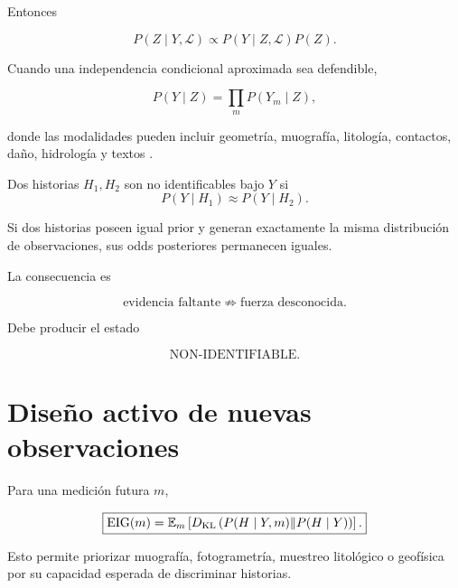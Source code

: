 Entonces

\begin{equation}
\boxed{
P(Z\mid Y,\mathcal L)
\propto
P(Y\mid Z,\mathcal L)P(Z).
}
\end{equation}

Cuando una independencia condicional aproximada sea defendible,

\begin{equation}
P(Y\mid Z)
=
\prod_m
P(Y_m\mid Z),
\end{equation}

donde las modalidades pueden incluir geometría, muografía, litología, contactos, daño, hidrología y textos \cite{kaipio2005,tarantola2005,gelman2013}.

\begin{definition}
Dos historias \(H_1,H_2\) son no identificables bajo \(Y\) si
\begin{equation}
P(Y\mid H_1)
\approx
P(Y\mid H_2).
\end{equation}
\end{definition}

\begin{proposition}
Si dos historias poseen igual prior y generan exactamente la misma distribución de observaciones, sus odds posteriores permanecen iguales.
\end{proposition}

La consecuencia es

\begin{equation}
\boxed{
\text{evidencia faltante}
\not\Rightarrow
\text{fuerza desconocida}.
}
\end{equation}

Debe producir el estado

\begin{equation}
\boxed{
\text{NON-IDENTIFIABLE}.
}
\end{equation}

\section{Diseño activo de nuevas observaciones}

Para una medición futura \(m\),

\begin{equation}
\boxed{
\mathrm{EIG}(m)
=
\mathbb E_m
\left[
D_{\mathrm{KL}}
\left(
P(H\mid Y,m)
\|
P(H\mid Y)
\right)
\right].
}
\end{equation}

Esto permite priorizar muografía, fotogrametría, muestreo litológico o geofísica por su capacidad esperada de discriminar historias.

